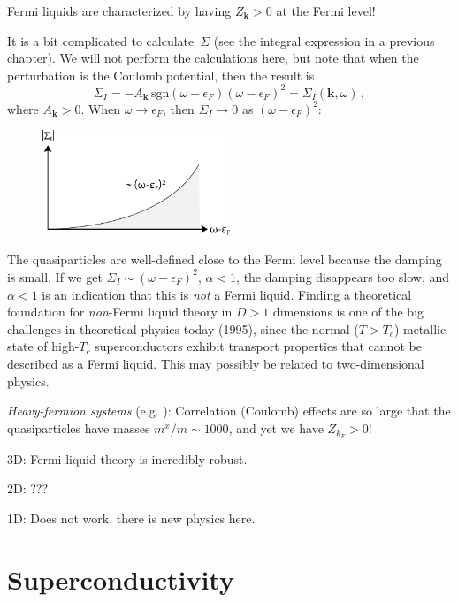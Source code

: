 \clearpage



\begin{Indent}
  Fermi liquids are characterized by having $Z_{\bm k} > 0$ at the Fermi level!
\end{Indent}
It is a bit complicated to calculate~$\Sigma$ (see the integral expression in a previous chapter).
We will not perform the calculations here, but note that when the perturbation is the Coulomb potential, then the result is
\[
  \Sigma_I = -A_{\bm k}\, \mathrm{sgn}(\omega-\epsilon_F) (\omega-\epsilon_F)^2 = \Sigma_I(\bm k, \omega) \,,
\]
where $A_{\bm k} > 0$.
When $\omega \rightarrow \epsilon_F$, then $\Sigma_I \rightarrow 0$ as $(\omega-\epsilon_F)^2$:

\begin{figure}[H]
  \centering
  \includegraphics[width=0.5\textwidth]{img/pp181-200_selfenergy.pdf}
\end{figure}

The quasiparticles are well-defined close to the Fermi level because the damping is small.
If we get $\Sigma_I \sim (\omega-\epsilon_F)^2$, $\alpha < 1$, the damping disappears too slow, and $\alpha < 1$ is an indication that this is \emph{not} a Fermi liquid.
Finding a theoretical foundation for \emph{non}-Fermi liquid theory in $D>1$ dimensions is one of the big challenges in theoretical physics today (1995), since the normal ($T>T_c$) metallic state of high-$T_c$ superconductors exhibit transport properties that cannot be described as a Fermi liquid.
This may possibly be related to two-dimensional physics.

\emph{Heavy-fermion systems} (e.g. ): Correlation (Coulomb) effects are so large that the quasiparticles have masses $m^x/m \sim 1000$, and yet we have $Z_{k_F} > 0$!

3D: Fermi liquid theory is incredibly robust.

2D: ???

1D: Does not work, there is new physics here.



\clearpage
\section{Superconductivity}
